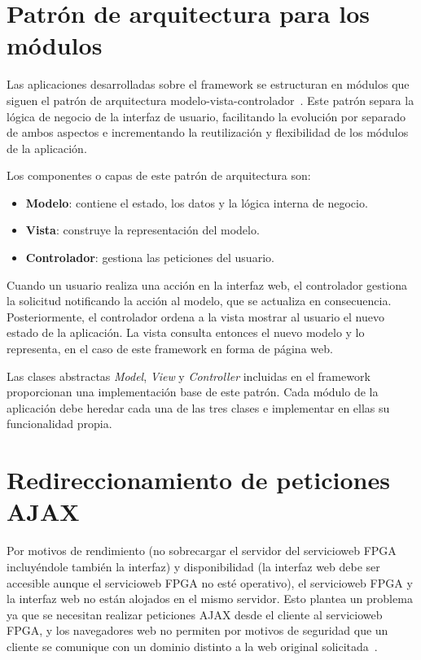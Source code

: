 \section{Patrón de arquitectura para los módulos\label{extra:mvc:mvc}}

Las aplicaciones desarrolladas sobre el \gls{framework} se estructuran en módulos que siguen el patrón de arquitectura modelo-vista-controlador~\cite{mvcpattern}.
Este patrón separa la lógica de negocio de la interfaz de usuario, facilitando la evolución por separado de ambos aspectos e incrementando la reutilización y flexibilidad de los módulos de la aplicación.

Los componentes o capas de este patrón de arquitectura son:
\begin{itemize}
  \item \textbf{Modelo}: contiene el estado, los datos y la lógica interna de negocio.
  \item \textbf{Vista}: construye la representación del modelo.
  \item \textbf{Controlador}: gestiona las peticiones del usuario.
\end{itemize}

Cuando un usuario realiza una acción en la interfaz web, el controlador gestiona la solicitud notificando la acción al modelo, que se actualiza en consecuencia.
Posteriormente, el controlador ordena a la vista mostrar al usuario el nuevo estado de la aplicación.
La vista consulta entonces el nuevo modelo y lo representa, en el caso de este \gls{framework} en forma de página web.

Las clases abstractas \textit{Model}, \textit{View} y \textit{Controller} incluidas en el \gls{framework} proporcionan una implementación base de este patrón.
Cada módulo de la aplicación debe heredar cada una de las tres clases e implementar en ellas su funcionalidad propia.


\section{Redireccionamiento de peticiones \gls{AJAX}\label{extra:mvc:proxy}}

Por motivos de rendimiento (no sobrecargar el servidor del \gls{servicioweb} \gls{FPGA} incluyéndole también la interfaz) y disponibilidad (la interfaz web debe ser accesible aunque el \gls{servicioweb} \gls{FPGA} no esté operativo), el \gls{servicioweb} \gls{FPGA} y la interfaz web no están alojados en el mismo servidor.
Esto plantea un problema ya que se necesitan realizar peticiones \gls{AJAX} desde el cliente al \gls{servicioweb} \gls{FPGA}, y los navegadores web no permiten por motivos de seguridad que un cliente se comunique con un dominio distinto a la web original solicitada~\cite{sameorigin}.

